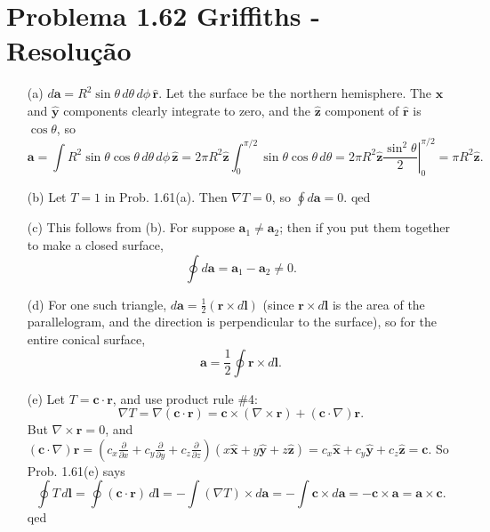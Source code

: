 \documentclass[a4paper,12pt]{article}
\begin{document}
\section*{Problema 1.62 Griffiths - Resolu\c{c}\~ao}

\begin{itemize}
    \item[(a)] $d\mathbf{a} = R^2 \sin \theta \, d\theta \, d\phi \, \hat{\mathbf{r}}.$ Let the surface be the northern hemisphere. The $\hat{\mathbf{x}}$ and $\hat{\mathbf{y}}$ components clearly integrate to zero, and the $\hat{\mathbf{z}}$ component of $\hat{\mathbf{r}}$ is $\cos \theta$, so  
    \[
    \mathbf{a} = \int R^2 \sin \theta \cos \theta \, d\theta \, d\phi \, \hat{\mathbf{z}}
    = 2\pi R^2 \hat{\mathbf{z}} \int_0^{\pi/2} \sin \theta \cos \theta \, d\theta 
    = 2\pi R^2 \hat{\mathbf{z}} \left.\frac{\sin^2 \theta}{2}\right|_0^{\pi/2} 
    = \pi R^2 \hat{\mathbf{z}}.
    \]

    \item[(b)] Let $T = 1$ in Prob. 1.61(a). Then $\nabla T = 0$, so $\oint d\mathbf{a} = 0.$ \hspace{1cm} qed

    \item[(c)] This follows from (b). For suppose $\mathbf{a}_1 \neq \mathbf{a}_2$; then if you put them together to make a closed surface, 
    \[
    \oint d\mathbf{a} = \mathbf{a}_1 - \mathbf{a}_2 \neq 0.
    \]

    \item[(d)] For one such triangle, $d\mathbf{a} = \frac{1}{2} (\mathbf{r} \times d\mathbf{l})$ (since $\mathbf{r} \times d\mathbf{l}$ is the area of the parallelogram, and the direction is perpendicular to the surface), so for the entire conical surface, 
    \[
    \mathbf{a} = \frac{1}{2} \oint \mathbf{r} \times d\mathbf{l}.
    \]

    \item[(e)] Let $T = \mathbf{c} \cdot \mathbf{r}$, and use product rule \#4: 
    \[
    \nabla T = \nabla (\mathbf{c} \cdot \mathbf{r}) = \mathbf{c} \times (\nabla \times \mathbf{r}) + (\mathbf{c} \cdot \nabla)\mathbf{r}.
    \] 
    But $\nabla \times \mathbf{r} = 0$, and $(\mathbf{c} \cdot \nabla)\mathbf{r} = (c_x \frac{\partial}{\partial x} + c_y \frac{\partial}{\partial y} + c_z \frac{\partial}{\partial z})(x \hat{\mathbf{x}} + y \hat{\mathbf{y}} + z \hat{\mathbf{z}}) = c_x \hat{\mathbf{x}} + c_y \hat{\mathbf{y}} + c_z \hat{\mathbf{z}} = \mathbf{c}.$  
    So Prob. 1.61(e) says  
    \[
    \oint T \, d\mathbf{l} = \oint (\mathbf{c} \cdot \mathbf{r}) \, d\mathbf{l} = -\int (\nabla T) \times d\mathbf{a} = -\int \mathbf{c} \times d\mathbf{a} = -\mathbf{c} \times \mathbf{a} = \mathbf{a} \times \mathbf{c}.
    \]
    \hspace{1cm} qed
\end{itemize}
\end{document}

